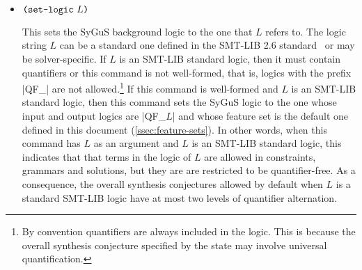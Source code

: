 \documentclass[english,a4paper,10pt]{article}
\begin{document}
\begin{itemize}
\item $\texttt{(}\texttt{set-logic}\mbox{ }L\texttt{)}$

This sets the SyGuS background logic to the one that $L$ refers to.
The logic string $L$ can be a standard one defined in the SMT-LIB 2.6 standard~\cite{BarFT-RR-17}
or may be solver-specific.
If $L$ is an SMT-LIB standard logic,
then it must contain quantifiers or this command is not well-formed,
that is, logics with the prefix \code|QF_| are not allowed.\footnote{
By convention quantifiers are always included in the logic. This is because
the overall synthesis conjecture specified by the
state may involve universal quantification.
}
If this command is well-formed and $L$ is an SMT-LIB standard logic,
then this command sets the SyGuS logic to the one whose
input and output logics are \code|QF_$L$| and whose feature
set is the default one defined in this document (\cref{ssec:feature-sets}).
In other words, when this command has $L$ as an argument
and $L$ is an SMT-LIB standard logic,
this indicates that that terms in the logic of $L$ are
allowed in constraints, grammars and solutions,
but they are are restricted to be quantifier-free.
As a consequence,  the overall synthesis conjectures 
allowed by default when $L$ is a standard SMT-LIB logic
have at most two levels of quantifier alternation.

\begin{comment}
\item $\paren{\setlogicinputkwd\mbox{ }S}$

This sets the input logic component of the SyGuS background logic
to the one $S$ refers to,
which can be a standard one defined in SMT-LIB~\cite{BarFT-RR-17}
or may be solver-specific.
This command adds the set of sort and function symbols
from the logic to the current signature.
Some of the standard logics defined by SMT-LIB that can be an argument of this
command are given in \cref{ssec:smt-logic}.


\end{comment}
\end{itemize}
\end{document}
